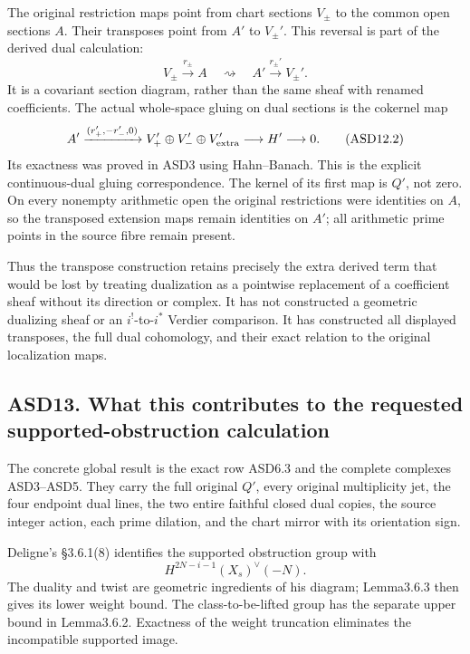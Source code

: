 The original restriction maps point from chart sections \(V_\pm\) to the
common open sections \(A\). Their transposes point from \(A'\) to
\(V_\pm'\). This reversal is part of the derived dual calculation: \[
 V_\pm\xrightarrow{r_\pm}A
 \quad\rightsquigarrow\quad
 A'\xrightarrow{r_\pm'}V_\pm'.
 \tag{ASD12.1}
\] It is a covariant section diagram, rather than the same sheaf with
renamed coefficients. The actual whole-space gluing on dual sections is
the cokernel map \[
 A'\xrightarrow{(r_+',-r_-',0)}
 V_+'\oplus V_-'\oplus V_{\rm extra}'
 \longrightarrow H'\longrightarrow0.
 \tag{ASD12.2}
\] Its exactness was proved in ASD3 using Hahn--Banach. This is the
explicit continuous-dual gluing correspondence. The kernel of its first
map is \(Q'\), not zero. On every nonempty arithmetic open the original
restrictions were identities on \(A\), so the transposed extension maps
remain identities on \(A'\); all arithmetic prime points in the source
fibre remain present.

Thus the transpose construction retains precisely the extra derived term
that would be lost by treating dualization as a pointwise replacement of
a coefficient sheaf without its direction or complex. It has not
constructed a geometric dualizing sheaf or an \(i^!\)-to-\(i^*\) Verdier
comparison. It has constructed all displayed transposes, the full dual
cohomology, and their exact relation to the original localization maps.

\subsection{ASD13. What this contributes to the requested
supported-obstruction
calculation}\label{asd13.-what-this-contributes-to-the-requested-supported-obstruction-calculation}

The concrete global result is the exact row ASD6.3 and the complete
complexes ASD3--ASD5. They carry the full original \(Q'\), every
original multiplicity jet, the four endpoint dual lines, the two entire
faithful closed dual copies, the source integer action, each prime
dilation, and the chart mirror with its orientation sign.

Deligne's §3.6.1(8) identifies the supported obstruction group with \[
 H^{2N-i-1}(X_s)^\vee(-N).
\] The duality and twist are geometric ingredients of his diagram;
Lemma3.6.3 then gives its lower weight bound. The class-to-be-lifted
group has the separate upper bound in Lemma3.6.2. Exactness of the
weight truncation eliminates the incompatible supported image.

